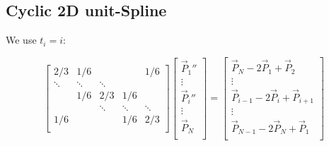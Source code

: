 \documentclass[aps,12pt]{revtex4}
\begin{document}
\subsection{Cyclic 2D unit-Spline}

We use $t_i=i$:

\begin{equation}
\begin{bmatrix}
2/3 & 1/6 &   &   & 1/6 \\
\ddots & \ddots & \ddots &   &   \\
  & 1/6 & 2/3 & 1/6 &  \\
  &   & \ddots & \ddots & \ddots\\
1/6 &   &   & 1/6 & 2/3\\
\end{bmatrix}
\begin{bmatrix}
\vec{P}_1''\\
\vdots\\
\vec{P}_i''\\
\vdots\\
\vec{P}_N\\
\end{bmatrix}
=
\begin{bmatrix}
\vec{P}_N - 2\vec{P}_1 + \vec{P}_2\\
\vdots \\
\vec{P}_{i-1} - 2\vec{P}_i + \vec{P}_{i+1} \\
\vdots\\
\vec{P}_{N-1} - 2\vec{P}_N + \vec{P}_1\\
\end{bmatrix}
\end{equation}
\end{document}
